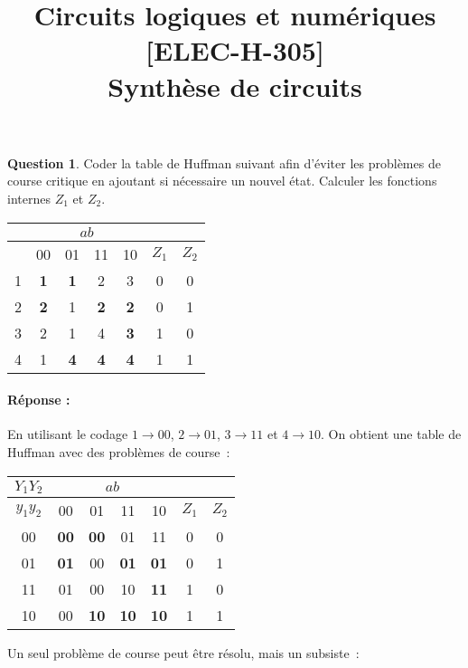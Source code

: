 \documentclass[11pt,a4paper]{article}
\date{}
\title{\vspace{-2cm}Circuits logiques et numériques [ELEC-H-305] \\  \tpnumber Synthèse de circuits \ifthenelse{\boolean{corrige}}{-- Corrigé}{} \\ \small{\version}}
\theoremstyle{definition}%
\newtheorem{Q}{Question}[] %
\newcommand{\reponse}[1]{%
	\ifthenelse {\boolean{corrige}} {\paragraph{Réponse :} \color{darkblue}   #1\color{black}} {}
 }
\begin{document}
\maketitle
\vspace*{-1cm}


\begin{Q}
Coder la table de Huffman suivant afin d'éviter les problèmes de course critique en ajoutant si nécessaire un nouvel état.
Calculer les fonctions internes $Z_1$ et $Z_2$.

\begin{center}
	\begin{tabular}{|c|c|c|c|c|c|c|}\hline
	& \multicolumn{4}{c|}{$ab$} & \multicolumn{2}{c|}{} \\ \hline
	  & 00 & 01 & 11 & 10 & $Z_1$ & $Z_2$ \\ \hline
	1 & \textbf{1} & \textbf{1} & 2 & 3 & 0 & 0 \\ \hline
	2 & \textbf{2} & 1 & \textbf{2} & \textbf{2} & 0 & 1 \\ \hline
	3 & 2 & 1 & 4 & \textbf{3} & 1 & 0 \\ \hline
	4 & 1 & \textbf{4} & \textbf{4} & \textbf{4} & 1 & 1 \\ \hline
	\end{tabular}
\end{center}

\reponse{
	En utilisant le codage $1 \rightarrow 00$, $2 \rightarrow 01$, $3 \rightarrow 11$ et $4 \rightarrow 10$.
	On obtient une table de Huffman avec des problèmes de course~:
	
	\begin{center}
		\begin{tabular}{|c|c|c|c|c|c|c|}\hline
		$Y_1Y_2$ & \multicolumn{4}{c|}{$ab$} & \multicolumn{2}{c|}{} \\ \hline
		$y_1y_2$ & 00 & 01 & 11 & 10 & $Z_1$ & $Z_2$ \\ \hline
		00 & \textbf{00} & \textbf{00} & 01 & {\color{red}11} & 0 & 0 \\ \hline
		01 & \textbf{01} & 00 & \textbf{01} & \textbf{01} & 0 & 1 \\ \hline
		11 & 01 & {\color{red}00} & 10 & \textbf{11} & 1 & 0 \\ \hline
		10 & 00 & \textbf{10} & \textbf{10} & \textbf{10} & 1 & 1 \\ \hline
		\end{tabular}
	\end{center}

	Un seul problème de course peut être résolu, mais un subsiste~:
	
}
\end{Q}
\end{document}
